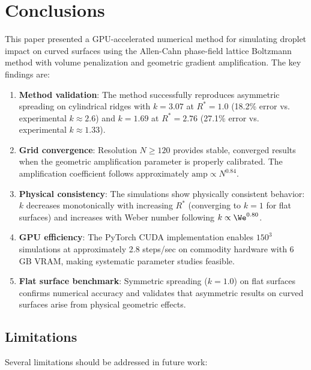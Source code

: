 \section{Conclusions}
\label{sec:conclusion}

This paper presented a GPU-accelerated numerical method for simulating droplet impact on curved surfaces using the Allen-Cahn phase-field lattice Boltzmann method with volume penalization and geometric gradient amplification. The key findings are:

\begin{enumerate}
    \item \textbf{Method validation}: The method successfully reproduces asymmetric spreading on cylindrical ridges with $k = 3.07$ at $R^* = 1.0$ (18.2\% error vs. experimental $k \approx 2.6$) and $k = 1.69$ at $R^* = 2.76$ (27.1\% error vs. experimental $k \approx 1.33$).
    
    \item \textbf{Grid convergence}: Resolution $N \geq 120$ provides stable, converged results when the geometric amplification parameter is properly calibrated. The amplification coefficient follows approximately $\text{amp} \propto N^{0.84}$.
    
    \item \textbf{Physical consistency}: The simulations show physically consistent behavior: $k$ decreases monotonically with increasing $R^*$ (converging to $k = 1$ for flat surfaces) and increases with Weber number following $k \propto \We^{0.80}$.
    
    \item \textbf{GPU efficiency}: The PyTorch CUDA implementation enables $150^3$ simulations at approximately 2.8 steps/sec on commodity hardware with 6 GB VRAM, making systematic parameter studies feasible.
    
    \item \textbf{Flat surface benchmark}: Symmetric spreading ($k = 1.0$) on flat surfaces confirms numerical accuracy and validates that asymmetric results on curved surfaces arise from physical geometric effects.
\end{enumerate}

\subsection{Limitations}

Several limitations should be addressed in future work:

